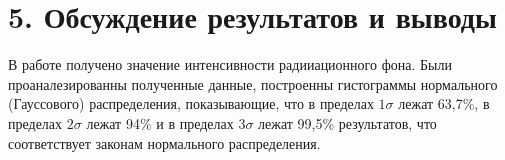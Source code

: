 \section*{5. Обсуждение результатов и выводы}


В работе получено значение интенсивности радииационного фона. Были проаналезированны полученные данные, построенны гистограммы нормального (Гауссового) распределения, показывающие, что в пределах $1\sigma$ лежат 63,7\%, в пределах $2\sigma$ лежат 94\% и в пределах $3\sigma$ лежат 99,5\% результатов, что соответствует законам нормального распределения.


